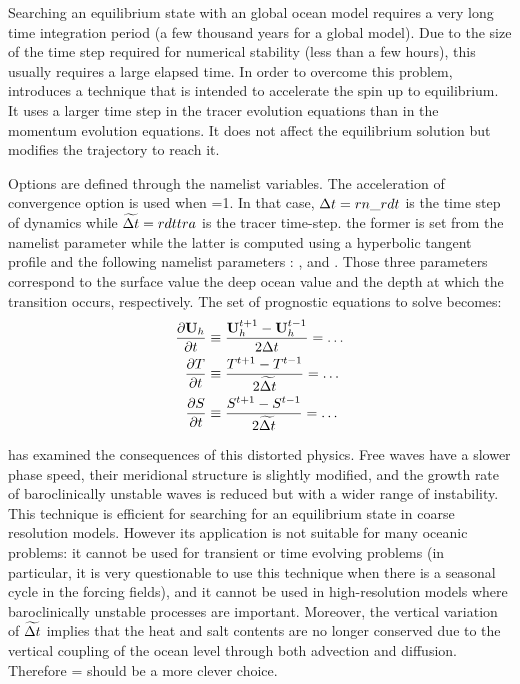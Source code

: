 Searching an equilibrium state with an global ocean model requires a very long time 
integration period (a few thousand years for a global model). Due to the size of 
the time step required for numerical stability (less than a few hours), 
this usually requires a large elapsed time. In order to overcome this problem, 
\citet{Bryan1984} introduces a technique that is intended to accelerate 
the spin up to equilibrium. It uses a larger time step in 
the tracer evolution equations than in the momentum evolution 
equations. It does not affect the equilibrium solution but modifies the 
trajectory to reach it.

Options are defined through the   namelist variables.
The acceleration of convergence option is used when =1. In that case, 
$\Delta t=rn\_rdt$ is the time step of dynamics while $\widetilde{\Delta t}=rdttra$ is the 
tracer time-step. the former is set from the  namelist parameter while the latter
is computed using a hyperbolic tangent profile and the following namelist parameters : 
,  and . Those three parameters correspond 
to the surface value the deep ocean value and the depth at which the transition occurs, respectively. 
The set of prognostic equations to solve becomes:
\begin{equation} \label{Eq_acc}
\begin{split}
\frac{\partial \textbf{U}_h }{\partial t} 
	&\equiv \frac{\textbf{U}_h ^{t+1}-\textbf{U}_h^{t-1} }{2\Delta t} = \ldots \\ 
\frac{\partial T}{\partial t} &\equiv \frac{T^{t+1}-T^{t-1}}{2 \widetilde{\Delta t}} = \ldots \\ 
\frac{\partial S}{\partial t} &\equiv \frac{S^{t+1} -S^{t-1}}{2 \widetilde{\Delta t}} = \ldots \\ 
\end{split}
\end{equation}

\citet{Bryan1984} has examined the consequences of this distorted physics. 
Free waves have a slower phase speed, their meridional structure is slightly 
modified, and the growth rate of baroclinically unstable waves is reduced 
but with a wider range of instability. This technique is efficient for 
searching for an equilibrium state in coarse resolution models. However its 
application is not suitable for many oceanic problems: it cannot be used for 
transient or time evolving problems (in particular, it is very questionable 
to use this technique when there is a seasonal cycle in the forcing fields), 
and it cannot be used in high-resolution models where baroclinically 
unstable processes are important. Moreover, the vertical variation of 
$\widetilde{ \Delta t}$ implies that the heat and salt contents are no longer 
conserved due to the vertical coupling of the ocean level through both 
advection and diffusion. Therefore  =  should be
a more clever choice.


